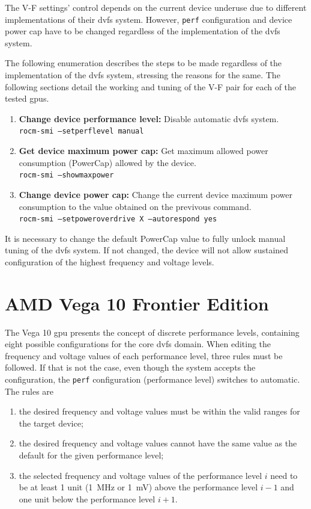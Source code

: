 The V-F settings' control depends on the current device underuse due to different implementations of their \acrshort{dvfs} system. However, \texttt{perf} configuration and device power cap have to be changed regardless of the implementation of the \acrshort{dvfs} system. 

The following enumeration describes the steps to be made regardless of the implementation of the \acrshort{dvfs} system, stressing the reasons for the same. The following sections detail the working and tuning of the V-F pair for each of the tested \acrshort{gpu}s.

\begin{enumerate}
\item \textbf{Change device performance level:} Disable automatic \acrshort{dvfs} system.\\
\texttt{rocm-smi --setperflevel manual}
\item \textbf{Get device maximum power cap:} Get maximum allowed power consumption (PowerCap) allowed by the device. \\
\texttt{rocm-smi --showmaxpower} 
\item \textbf{Change device power cap:} Change the current device maximum power consumption to the value obtained on the previvous command.\\
\texttt{rocm-smi --setpoweroverdrive X --autorespond yes}
\end{enumerate}

It is necessary to change the default PowerCap value to fully unlock manual tuning of the \acrshort{dvfs} system. If not changed, the device will not allow sustained configuration of the highest frequency and voltage levels.

\section{AMD Vega 10 Frontier Edition}

The Vega 10 \acrshort{gpu} presents the concept of discrete performance levels, containing eight possible configurations for the core \acrshort{dvfs} domain. 
When editing the frequency and voltage values of each performance level, three rules must be followed. If that is not the case, even though the system accepts the configuration, the \texttt{perf} configuration (performance level) switches to automatic. The rules are 

\begin{enumerate}
\item the desired frequency and voltage values must be within the valid ranges for the target device; 
\item the desired frequency and voltage values cannot have the same value as the default for the given performance level; 
\item the selected frequency and voltage values of the performance level $i$ need to be at least 1 unit (1~MHz or 1~mV) above the performance level $i-1$ and one unit below the performance level $i+1$.
\end{enumerate}

